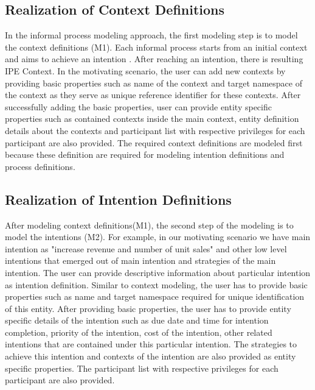 \subsection{Realization of Context Definitions}
In the informal process modeling approach, the first modeling step is to model the context definitions (M1). Each informal process starts from an initial context and aims to achieve an intention \cite{Sungur2014a}. After reaching an intention, there is resulting IPE Context. In the motivating scenario, the user can add new contexts by providing basic properties such as name of the context and target namespace of the context as they serve as unique reference identifier for these contexts. After successfully adding the basic properties, user can provide entity specific properties such as contained contexts inside the main context, entity definition details about the contexts and participant list with respective privileges for each participant are also provided. The required context definitions are modeled first because these definition are required for modeling intention definitions and process definitions.  

\subsection{Realization of Intention Definitions}
After modeling context definitions(M1), the second step of the modeling is to model the intentions (M2). For example, in our motivating scenario we have main intention as "increase revenue and number of unit sales" and other low level intentions that emerged out of main intention and strategies of the main intention. The user can provide descriptive information about particular intention as intention definition. Similar to context modeling, the user has to provide basic properties such as name and target namespace required for unique identification of this entity. After providing basic properties, the user has to provide entity specific details of the intention such as due date and time for intention completion, priority of the intention, cost of the intention, other related intentions that are contained under this particular intention. The strategies to achieve this intention and contexts of the intention are also provided as entity specific properties. The participant list with respective privileges for each participant are also provided. 

